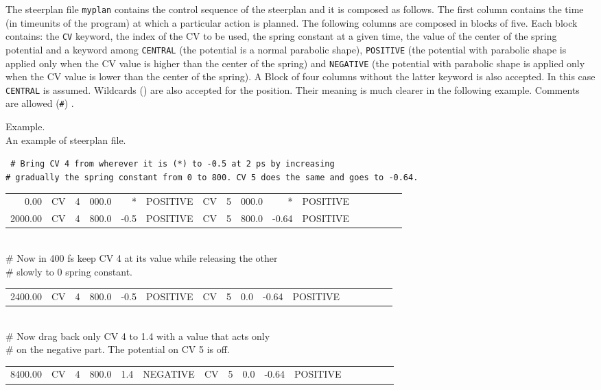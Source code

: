 \documentclass[12pt,fleqn]{report}
\newcommand{\esempio}[1]{
\vspace{10pt}
\begin{flushright}
\colorbox{light-gray}{
   \begin{minipage}{13cm}
       \scriptsize{
{\fontfamily{phv} \fontseries{b}
 \selectfont Example. \\
 \fontseries{m} \selectfont #1 } }
\end{minipage}}
\end{flushright}
\vspace{20pt}
}
\begin{document}
The steerplan file {\tt myplan} contains the control sequence of the steerplan and it is composed as follows.
The first column contains the time (in timeunits of the program) at which a particular action is planned. The following columns are 
composed in blocks of five. Each block contains: the {\tt CV} keyword, the index of the CV to be used, the spring
constant at a given time, the value of the center of the spring potential and a keyword among  {\tt CENTRAL} (the potential is
a normal parabolic shape), {\tt POSITIVE} (the potential with parabolic shape is applied only when the CV value is higher than the center of the 
spring) and {\tt NEGATIVE} (the potential with parabolic shape is applied only when the CV value is lower than the center of the   
spring). A Block of four columns without the latter keyword is also accepted. In this case {\tt CENTRAL} is assumed.   
Wildcards ({\tt *}) are also accepted for the position. Their meaning is much clearer in the following example. 
Comments are allowed  ({\tt \#}) .
\esempio{An example of steerplan file.
 \vspace{10pt}\\
{\tt
\# Bring CV 4 from wherever it is (*) to -0.5 at 2 ps by increasing \\ 
\# gradually the spring constant from 0 to 800. CV 5 does the same and goes to -0.64.  \\ 
\begin{tabular} {r  r r r r r  r r r r r  r r r r r }
      0.00 & CV &  4 &  000.0 &   *    &   POSITIVE &  CV &  5 &  000.0 &   *     &   POSITIVE   \\
   2000.00 & CV &  4 &  800.0 &  -0.5  &   POSITIVE &  CV &  5 &  800.0 &   -0.64 &   POSITIVE   \\
\end{tabular}\\
\# Now in 400 fs keep CV 4 at its value while releasing the other \\
\# slowly to 0 spring constant.    \\ 
\begin{tabular} {r  r r r r r  r r r r r  r r r r r }
   2400.00 & CV &  4 &  800.0 &  -0.5  &   POSITIVE &  CV &  5 &    0.0 &   -0.64 &   POSITIVE   \\
\end{tabular}\\
\# Now drag back only CV 4 to 1.4 with a value that acts only \\
\# on the negative part. The potential on CV 5 is off.  \\
\begin{tabular} {r  r r r r r  r r r r r  r r r r r }
   8400.00 & CV &  4 &  800.0 &   1.4  &   NEGATIVE &  CV &  5 &    0.0 &   -0.64 &   POSITIVE   \\
\end{tabular}\\
}
} 
\end{document}

